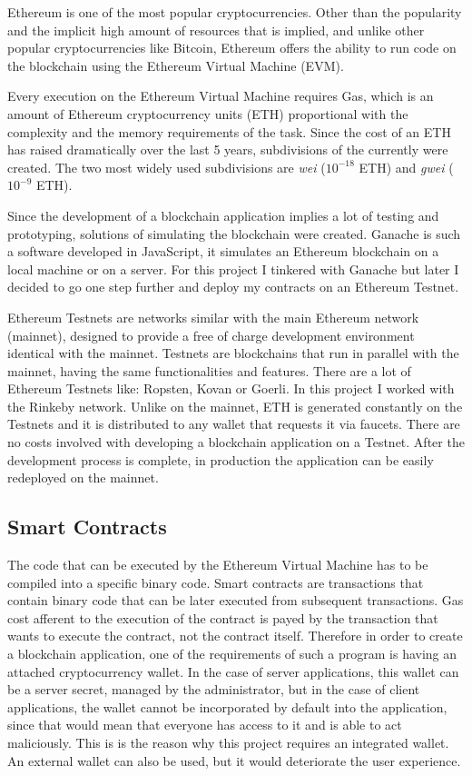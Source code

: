 \documentclass[a4paper,12pt]{report}
\begin{document}
Ethereum is one of the most popular cryptocurrencies. Other than the popularity
and the implicit high amount of resources that is implied, and unlike other
popular cryptocurrencies like Bitcoin, Ethereum offers the ability to run code
on the blockchain using the Ethereum Virtual Machine (EVM)\cite{ethereumDocs}.

Every execution on the Ethereum Virtual Machine requires Gas, which is an
amount of Ethereum cryptocurrency units (ETH) proportional with the complexity
and the memory requirements of the task. Since the cost of an ETH has raised
dramatically over the last 5 years, subdivisions of the currently were created.
The two most widely used subdivisions are \textit{wei} (\(10^{-18}\) ETH) and
\textit{gwei} (\(10^{-9}\) ETH).

Since the development of a blockchain application implies a lot of testing and
prototyping, solutions of simulating the blockchain were created. Ganache is
such a software developed in JavaScript, it simulates an Ethereum blockchain on
a local machine or on a server. For this project I tinkered with Ganache but
later I decided to go one step further and deploy my contracts on an Ethereum
Testnet.

Ethereum Testnets are networks similar with the main Ethereum network
(mainnet), designed to provide a free of charge development environment
identical with the mainnet. Testnets are blockchains that run in parallel with
the mainnet, having the same functionalities and features. There are a lot of
Ethereum Testnets like: Ropsten, Kovan or Goerli. In this project I worked with
the Rinkeby network. Unlike on the mainnet, ETH is generated constantly on the
Testnets and it is distributed to any wallet that requests it via faucets.
There are no costs involved with developing a blockchain application on a
Testnet. After the development process is complete, in production the
application can be easily redeployed on the mainnet.

\subsection{Smart Contracts}

The code that can be executed by the Ethereum Virtual Machine has to be
compiled into a specific binary code. Smart contracts are transactions that
contain binary code that can be later executed from subsequent transactions.
Gas cost afferent to the execution of the contract is payed by the transaction
that wants to execute the contract, not the contract itself. Therefore in order
to create a blockchain application, one of the requirements of such a program
is having an attached cryptocurrency wallet. In the case of server
applications, this wallet can be a server secret, managed by the administrator,
but in the case of client applications, the wallet cannot be incorporated by
default into the application, since that would mean that everyone has access to
it and is able to act maliciously. This is is the reason why this project
requires an integrated wallet. An external wallet can also be used, but it
would deteriorate the user experience.
\end{document}
